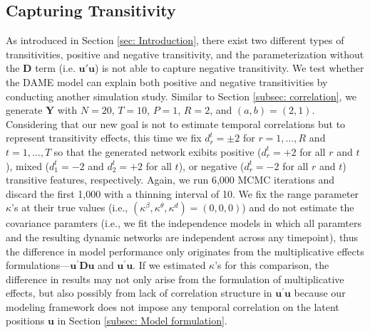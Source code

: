 \documentclass[a4paper]{article}
\begin{document}
\subsection{Capturing Transitivity} \label{subsec: negative transitivity}
As introduced in Section \ref{sec: Introduction}, there exist two different types of transitivities, positive and negative transitivity, and the parameterization without the $\mathbf{D}$ term (i.e. $\boldsymbol{u}'\boldsymbol{u}$) is not able to capture negative transitivity. We test whether the DAME model can explain both positive and negative transitivities by conducting another simulation study. Similar to Section \ref{subsec: correlation}, we generate $\mathbf{Y}$ with $N=20$, $T=10$, $P=1$, $R=2$, and $(a, b) = (2, 1)$. Considering that our new goal is not to estimate temporal correlations but to represent transitivity effects, this time we fix $d^t_{r} = \pm 2$ for $r=1,\ldots, R$ and $t=1,\ldots,T$ so that the generated network exibits positive ($d^t_{r} =+2$ for all $r$ and $t$), mixed ($d^t_{1} =-2$ and $d^t_{2} =+2$ for all $t$), or negative ($d^t_{r} =-2$ for all $r$ and $t$) transitive features, respectively. Again, we run 6,000 MCMC iterations and discard the first 1,000 with a thinning interval of 10. We fix the range parameter $\kappa$'s at their true values (i.e., $(\kappa^\beta, \kappa^\theta, \kappa^d) = (0, 0, 0)$) and do not estimate the covariance paramters (i.e., we fit the independence models in which all paramters and the resulting dynamic networks are independent across any timepoint), thus the difference in model performance only originates from the multiplicative effects formulations---$\boldsymbol{u}^\prime \mathbf{D}\boldsymbol{u}$ and $\boldsymbol{u}^\prime \boldsymbol{u}$. If we estimated $\kappa$'s for this comparison, the difference in results may not only arise from the formulation of multiplicative effects, but also possibly from lack of correlation structure in $\boldsymbol{u}^\prime\boldsymbol{u}$ because our modeling framework does not impose any temporal correlation on the latent positions $\boldsymbol{u}$ in Section \ref{subsec: Model formulation}.   \\ \newline 
\end{document}
